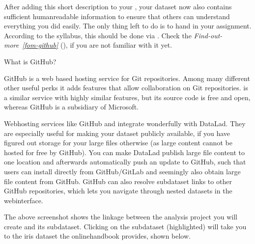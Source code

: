 \sphinxAtStartPar
After adding this short description to your , your dataset now also
contains sufficient human\sphinxhyphen{}readable information to ensure that others can understand
everything you did easily.
The only thing left to do is to hand in your assignment. According to the
syllabus, this should be done via {\hyperref[\detokenize{glossary:term-GitHub}]{}}. Check the \textit{Find-out-more}~{\findoutmoreiconinline}\textit{\ref{fom-github}} {\hyperref[\detokenize{basics/101-130-yodaproject:fom-github}]{}} (), if you are not familiar with it yet.

\ignorespaces \begin{findoutmore}[label={fom-github}, before title={\thetcbcounter\ }, float, floatplacement=p, check odd page=true]{What is GitHub?}
\label{\detokenize{basics/101-130-yodaproject:fom-github}}

\sphinxAtStartPar
GitHub is a web based hosting service for Git repositories. Among many
different other useful perks it adds features that allow collaboration on
Git repositories.  is a similar
service with highly similar features, but its source code is free and open,
whereas GitHub is a subsidiary of Microsoft.

\sphinxAtStartPar
Web\sphinxhyphen{}hosting services like GitHub and {\hyperref[\detokenize{glossary:term-GitLab}]{}} integrate wonderfully with
DataLad. They are especially useful for making your dataset publicly available,
if you have figured out storage for your large files otherwise (as large content
cannot be hosted for free by GitHub). You can make DataLad publish large file content to one location
and afterwards automatically push an update to GitHub, such that
users can install directly from GitHub/GitLab and seemingly also obtain large file
content from GitHub. GitHub can also resolve subdataset links to other GitHub
repositories, which lets you navigate through nested datasets in the web\sphinxhyphen{}interface.


\sphinxAtStartPar
The above screenshot shows the linkage between the analysis project you will create
and its subdataset. Clicking on the subdataset (highlighted) will take you to the iris dataset
the online\sphinxhyphen{}handbook provides, shown below.



\end{findoutmore}

